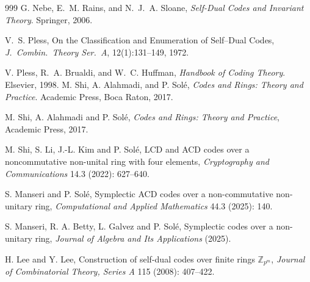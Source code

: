 \documentclass[11pt,a4paper]{article}
\theoremstyle{definition}
\numberwithin{equation}{section}
\begin{document}
\begin{thebibliography}{999}
G. Nebe, E.~M. Rains, and N.~J.~A. Sloane,
\emph{Self-Dual Codes and Invariant Theory}.
Springer, 2006.

V.~S. Pless,
On the Classification and Enumeration of Self–Dual Codes,
\emph{J.\ Combin.\ Theory Ser.\ A}, 12(1):131–149, 1972.

V. Pless, R.~A. Brualdi, and W.~C. Huffman,
\emph{Handbook of Coding Theory}.
Elsevier, 1998.
M. Shi, A. Alahmadi, and P. Solé,
\emph{Codes and Rings: Theory and Practice}.
Academic Press, Boca Raton, 2017.

M. Shi, A. Alahmadi and P. Solé,
{\em Codes and Rings: Theory and Practice},
Academic Press, 2017.

M. Shi, S. Li, J.-L. Kim and P. Solé,
LCD and ACD codes over a noncommutative non-unital ring with four elements,
{\em Cryptography and Communications} 14.3 (2022): 627–640.

S. Manseri and P. Solé,
Symplectic ACD codes over a non-commutative non-unitary ring,
{\em Computational and Applied Mathematics} 44.3 (2025): 140.

S. Manseri, R. A. Betty, L. Galvez and P. Solé,
Symplectic codes over a non-unitary ring,
{\em Journal of Algebra and Its Applications} (2025).

H. Lee and Y. Lee,
Construction of self-dual codes over finite rings $\mathbb{Z}_{p^m}$,
{\em Journal of Combinatorial Theory, Series A} 115 (2008): 407–422.

\end{thebibliography}
\end{document}
